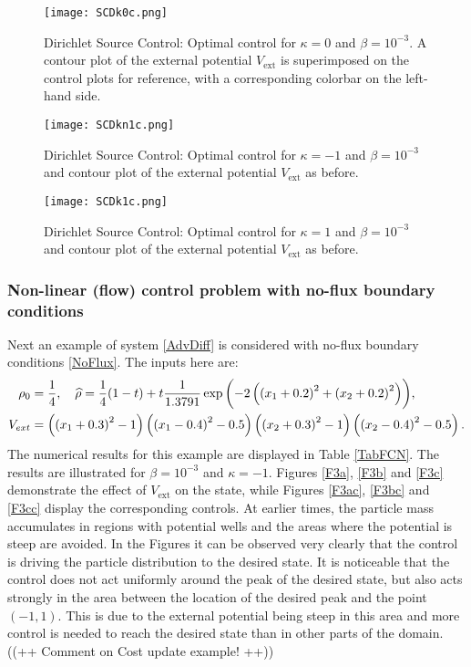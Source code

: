 	\begin{figure}[h]
	\centering
	\texttt{[image: SCDk0c.png]}
	\caption{Dirichlet Source Control: Optimal control for $\kappa = 0$ and $\beta = 10^{-3}$. A contour plot of the external potential \emph{$V_{\text{ext}}$} is superimposed on the control plots for reference, with a corresponding colorbar on the left-hand side.} 
	\label{F2ac}
\end{figure}
\begin{figure}[h]
	\centering
	\texttt{[image: SCDkn1c.png]}
	\caption{Dirichlet Source Control: Optimal control for $\kappa = -1$ and $\beta = 10^{-3}$ and contour plot of the external potential \emph{$V_{\text{ext}}$} as before.} 
	\label{F2bc}
\end{figure}
\begin{figure}[h]
	\centering
	\texttt{[image: SCDk1c.png]}
	\caption{Dirichlet Source Control: Optimal control for $\kappa = 1$ and $\beta = 10^{-3}$ and contour plot of the external potential \emph{$V_{\text{ext}}$} as before.} 
	\label{F2cc}
\end{figure}



\subsubsection{Non-linear (flow) control problem with no-flux boundary conditions}
Next an example of system \eqref{AdvDiff} is considered with no-flux boundary conditions \eqref{NoFlux}.
The inputs here are:
\begin{align*}
	\rho_0 &= \frac{1}{4}, \quad \widehat \rho = \frac{1}{4}(1-t) + t\frac{1}{1.3791}\exp{\left(-2\left(\left(x_1+0.2\right)^2 + \left(x_2+0.2\right)^2\right)\right)},\\
	V_{ext} &= \left(\left(x_1 + 0.3\right)^2 - 1\right)\left(\left(x_1-0.4\right)^2 - 0.5\right)
	\left(\left(x_2 + 0.3\right)^2 - 1\right)\left(\left(x_2-0.4\right)^2 - 0.5\right).
\end{align*}
The numerical results for this example are displayed in Table \ref{TabFCN}. The results are illustrated for $\beta = 10^{-3}$ and $\kappa = -1$. Figures \ref{F3a}, \ref{F3b} and \ref{F3c} demonstrate the effect of $V_{\text{ext}}$ on the state, while Figures \ref{F3ac}, \ref{F3bc} and \ref{F3cc} display the corresponding controls. At earlier times, the particle mass accumulates in regions with potential wells and the areas where the potential is steep are avoided. In the Figures it can be observed very clearly that the control is driving the particle distribution to the desired state. It is noticeable that the control does not act uniformly around the peak of the desired state, but also acts strongly in the area between the location of the desired peak and the point $(-1,1)$. This is due to the external potential being steep in this area and more control is needed to reach the desired state than in other parts of the domain. 
((++ Comment on Cost update example! ++))

